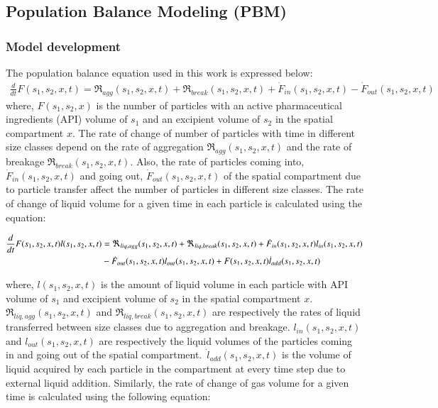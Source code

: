 \documentclass[preprint,11pt,authoryear]{elsarticle}
\begin{document}
\subsection{Population Balance Modeling (PBM)}
\label{sec:pbm_model}
\subsubsection{Model development}
 The population balance equation used in this work is expressed below:
\begin{align}
\frac{d}{dt}F(s_1,s_2,x,t)=\Re_{agg}(s_1,s_2,x,t)+\Re_{break}(s_1,s_2,x,t)+
\dot{F}_{in}(s_1,s_2,x,t)-\dot{F}_{out}(s_1,s_2,x,t)
\label{eqn:mthds_pbm_overall} 
\end{align}
where, $F(s_1,s_2,x)$ is the number of particles with an active pharmaceutical ingredients 
(API) volume of $s_1$ and an excipient 
volume of $s_2$ in the spatial compartment $x$. The rate of change of number of particles with time 
in different size classes depend on the rate of aggregation $\Re_{agg}(s_1,s_2,x,t)$ and the rate of 
breakage $\Re_{break}(s_1,s_2,x,t)$. Also, the rate of particles coming into, $\dot{F}_{in}(s_1,s_2,x,t)$ and 
going out, $\dot{F}_{out}(s_1,s_2,x,t)$ of the spatial compartment due to particle transfer affect the 
number of particles in different size classes. 
The rate of change of liquid volume for a given time in each particle is calculated using the equation: 

\begin{align}
\frac{d}{dt}F(s_1,s_2,x,t)l(s_1,s_2,x,t)&= 
\Re_{liq,agg}(s_1,s_2,x,t)+\Re_{liq,break}(s_1,s_2,x,t)+\dot{F}_{in}(s_1,s_2,x,t)l_{in}(s_1,s_2,x,t)\notag\\
&-\dot{F}_{out}(s_1,s_2,x,t)l_{out}(s_1,s_2,x,t)+F(s_1,s_2,x,t)\dot{l}_{add}(s_1,s_2,x,t)
\label{eqn:mthds_pbm_rate} 
\end{align}

where, $l(s_1,s_2,x,t)$ is the amount of liquid volume in each particle with API volume of $s_1$ and 
excipient volume of $s_2$ in the spatial compartment $x$. $\Re_{liq,agg}(s_1,s_2,x,t)$ and 
$\Re_{liq,break}(s_1,s_2,x,t)$ are respectively the rates of liquid transferred between size classes due to 
aggregation and breakage. $l_{in}(s_1,s_2,x,t)$ and $l_{out}(s_1,s_2,x,t)$ are respectively the liquid 
volumes of the particles coming in and going out of the spatial compartment.~$\dot{l}_{add}(s_1,s_2,x,t)$ is 
the volume of liquid acquired by each particle in the compartment at every time step due to external 
liquid addition.
Similarly, the rate of change of gas volume for a given time is calculated using the following equation: 
\end{document}
